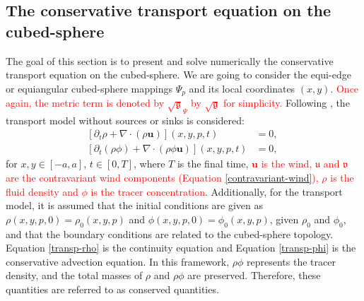 \documentclass[preprint,12pt]{elsarticle}
\begin{document}
\begin{linenumbers}

\section{The conservative transport equation on the cubed-sphere}
\label{adv-2d}
The goal of this section is to present and solve numerically the conservative transport equation on the cubed-sphere. 
We are going to consider the equi-edge or equiangular cubed-sphere mappings $\Psi_p$ and its local coordinates $(x,y)$.
\textcolor{red}{Once again, the metric term is denoted by $\sqrt{\mathfrak{g}}_{\Psi}$ by $\sqrt{\mathfrak{g}}$ for simplicity.}
Following \cite{nair:2010}, the transport model without sources or sinks is considered:
\begin{align}
	\label{transp-rho}
	[\partial_t \rho + \nabla \cdot (\rho \boldsymbol{u})](x,y,p,t)&=0,\\
	\label{transp-phi}
	[\partial_t (\rho \phi) + \nabla \cdot (\rho \phi \boldsymbol{u})](x,y,p,t)&=0,\
\end{align}
for $x,y\in[-a,a]$, $t \in [0,T]$, where $T$ is the final time,
\textcolor{red}
{$\boldsymbol{u}$ is the wind, $\mathfrak{u}$ and $\mathfrak{v}$ are the contravariant wind components (Equation \ref{contravariant-wind}),
$\rho$ is the fluid density and $\phi$ is the tracer concentration}.
Additionally, for the transport model, it is assumed that the initial conditions are given as $\rho(x,y,p,0)=\rho_0(x,y,p)$ and $\phi(x,y,p,0)=\phi_0(x,y,p)$, given $\rho_0$ and $\phi_0$, and that the boundary conditions are related to the cubed-sphere topology.
Equation \eqref{transp-rho} is the continuity equation and Equation \eqref{transp-phi} is the conservative advection equation.
In this framework, $\rho \phi$ represents the tracer density, and the total masses of $\rho$ and $\rho \phi$ are preserved.  Therefore, these quantities are referred to as conserved quantities.


\end{linenumbers}
\end{document}
